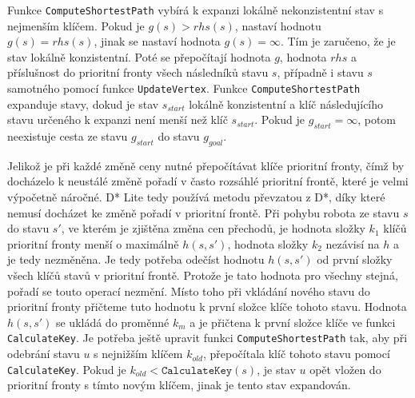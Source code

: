 Funkce \texttt{ComputeShortestPath} vybírá k expanzi lokálně nekonzistentní stav s nejmenším klíčem. Pokud je $g(s)>rhs(s)$, nastaví hodnotu $g(s)=rhs(s)$, jinak se nastaví hodnota $g(s)=\infty$. Tím je zaručeno, že je stav lokálně konzistentní. Poté se přepočítají hodnota $g$, hodnota $rhs$ a příslušnost do prioritní fronty všech následníků stavu $s$, případně i stavu $s$ samotného pomocí funkce \texttt{UpdateVertex}. Funkce \texttt{ComputeShortestPath} expanduje stavy, dokud je stav $s_{start}$ lokálně konzistentní a klíč následujícího stavu určeného k expanzi není menší než klíč $s_{start}$. Pokud je $g_{start}=\infty$, potom neexistuje cesta ze stavu $g_{start}$ do stavu $g_{goal}$.

Jelikož je při každé změně ceny nutné přepočítávat klíče prioritní fronty, čímž by docházelo k neustálé změně pořadí v často rozsáhlé prioritní frontě, které je velmi výpočetně náročné. D* Lite tedy používá metodu převzatou z D*, díky které nemusí docházet ke změně pořadí v prioritní frontě. Při pohybu robota ze stavu $s$ do stavu $s'$, ve kterém je zjištěna změna cen přechodů, je hodnota složky $k_1$ klíčů prioritní fronty menší o maximálně $h(s,s')$, hodnota složky $k_2$ nezávisí na $h$ a je tedy nezměněna. Je tedy potřeba odečíst hodnotu $h(s,s')$ od první složky všech klíčů stavů v prioritní frontě. Protože je tato hodnota pro všechny stejná, pořadí se touto operací nezmění. Místo toho při vkládání nového stavu do prioritní fronty přičteme tuto hodnotu k první složce klíče tohoto stavu. Hodnota $h(s,s')$ se ukládá do proměnné $k_m$ a je přičtena k první složce klíče ve funkci \texttt{CalculateKey}. Je potřeba ještě upravit funkci \texttt{ComputeShortestPath} tak, aby při odebrání stavu $u$ s nejnižším klíčem $k_{old}$, přepočítala klíč tohoto stavu pomocí \texttt{CalculateKey}. Pokud je $k_{old}<\texttt{CalculateKey}(s)$, je stav $u$ opět vložen do prioritní fronty s tímto novým klíčem, jinak je tento stav expandován.

